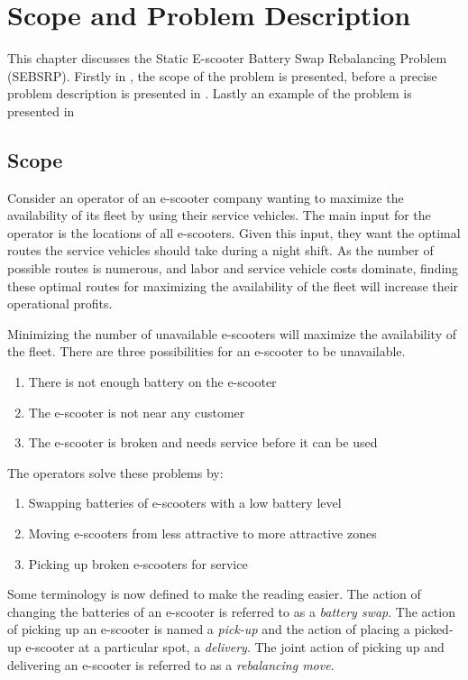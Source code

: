 \chapter{Scope and Problem Description}\label{scope and problem description}

This chapter discusses the Static E-scooter Battery Swap Rebalancing Problem (SEBSRP). Firstly in , the scope of the problem is presented, before a precise problem description is presented in . Lastly an example of the problem is presented in 

\section{Scope}\label{problem scope}

 Consider an operator of an e-scooter company wanting to maximize the availability of its fleet by using their service vehicles. The main input for the operator is the locations of all e-scooters. Given this input, they want the optimal routes the service vehicles should take during a night shift. As the number of possible routes is numerous, and labor and service vehicle costs dominate, finding these optimal routes for maximizing the availability of the fleet will increase their operational profits. 

Minimizing the number of unavailable e-scooters will maximize the availability of the fleet. There are three possibilities for an e-scooter to be unavailable.
\begin{enumerate}
\item There is not enough battery on the e-scooter
\item The e-scooter is not near any customer
\item The e-scooter is broken and needs service before it can be used
\end{enumerate}

The operators solve these problems by:

\begin{enumerate}
\item Swapping batteries of e-scooters with a low battery level
\item Moving e-scooters from less attractive to more attractive zones
\item Picking up broken e-scooters for service
\end{enumerate}

Some terminology is now defined to make the reading easier. The action of changing the batteries of an e-scooter is referred to as a \textit{battery swap}. The action of picking up an e-scooter is named a \textit{pick-up} and the action of placing a picked-up e-scooter at a particular spot, a \textit{delivery}. The joint action of picking up and delivering an e-scooter is referred to as a \textit{rebalancing move}. 

